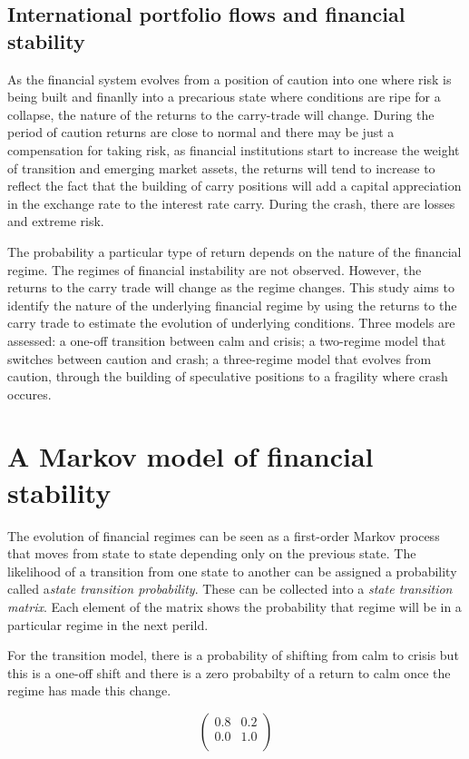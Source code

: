 \documentclass[12pt, a4paper, oneside]{article} %
\begin{document}
\subsection{International portfolio flows and financial stability}
As the financial system evolves from a position of caution into one where risk is being built and finanlly into a precarious state where conditions are ripe for a collapse, the nature of the returns to the carry-trade will change. During the period of caution returns are close to normal and there may be just a compensation for taking risk, as financial institutions start to increase the weight of transition and emerging market assets, the returns will tend to increase to reflect the fact that the building of carry positions will add a capital appreciation in the exchange rate to the interest rate carry. During the crash, there are losses and extreme risk.   

The probability a particular type of return depends on the nature of the financial regime.   The regimes of financial instability are not observed.  However, the returns to the carry trade will change as the regime changes. This study aims to identify the nature of the underlying financial regime by using the returns to the carry trade to estimate the evolution of underlying conditions.  Three models are assessed:  a one-off transition between calm and crisis; a two-regime model that switches between caution and crash; a three-regime model that evolves from caution, through the building of speculative positions to a fragility where crash occures.  


\section{A Markov model of financial stability}
The evolution of financial regimes can be seen as a first-order Markov process that moves from state to state depending only on the previous state.  The likelihood of a transition from one state to another can be assigned a probability called a\emph{state transition probability}.  These can be collected into a \emph{state transition matrix}. Each element of the matrix shows the probability that regime will be in a particular regime in the next perild. 

For the transition model, there is a probability of shifting from calm to crisis but this is a one-off shift and there is a zero probabilty of a return to calm once the regime has made this change.  

\begin{equation}
\label{eqref:m1}
\begin{pmatrix}
0.8 & 0.2 \\
0.0 & 1.0 \\
\end{pmatrix}
\end{equation}
\end{document}
